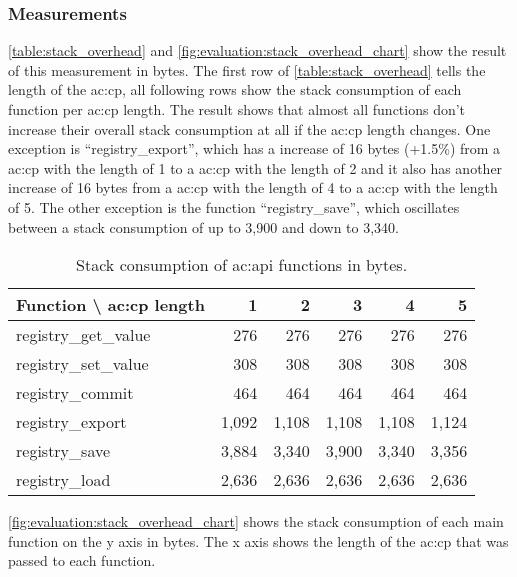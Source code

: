 \subsubsection{Measurements}

\autoref{table:stack_overhead} and \autoref{fig:evaluation:stack_overhead_chart} show the result of this measurement in bytes.
The first row of \autoref{table:stack_overhead} tells the length of the \gls{ac:cp}, all following rows show the stack consumption of each function per \gls{ac:cp} length.
The result shows that almost all functions don't increase their overall stack consumption at all if the \gls{ac:cp} length changes.
One exception is ``registry\_export'', which has a increase of 16 bytes (+1.5\%) from a \gls{ac:cp} with the length of 1 to a \gls{ac:cp} with the length of 2 and it also has another increase of 16 bytes from a \gls{ac:cp} with the length of 4 to a \gls{ac:cp} with the length of 5.
The other exception is the function ``registry\_save'', which oscillates between a stack consumption of up to 3,900 and down to 3,340.

\begin{table}[H]
    \begin{tabular}{ | l | r | r | r | r | r | }
        \hline
        Function \textbackslash{ \gls{ac:cp} length} & 1     & 2     & 3     & 4     & 5
        \\ \hline
        registry\_get\_value                         & 276   & 276   & 276   & 276   & 276   \\ \hline
        registry\_set\_value                         & 308   & 308   & 308   & 308   & 308   \\ \hline
        registry\_commit                             & 464   & 464   & 464   & 464   & 464   \\ \hline
        registry\_export                             & 1,092 & 1,108 & 1,108 & 1,108 & 1,124 \\ \hline
        registry\_save                               & 3,884 & 3,340 & 3,900 & 3,340 & 3,356 \\ \hline
        registry\_load                               & 2,636 & 2,636 & 2,636 & 2,636 & 2,636 \\ \hline
    \end{tabular}
    \caption{Stack consumption of  \gls{ac:api} functions in bytes.}
    \label{table:stack_overhead}
\end{table}

\autoref{fig:evaluation:stack_overhead_chart} shows the stack consumption of each main  function on the y axis in bytes.
The x axis shows the length of the \gls{ac:cp} that was passed to each function.

